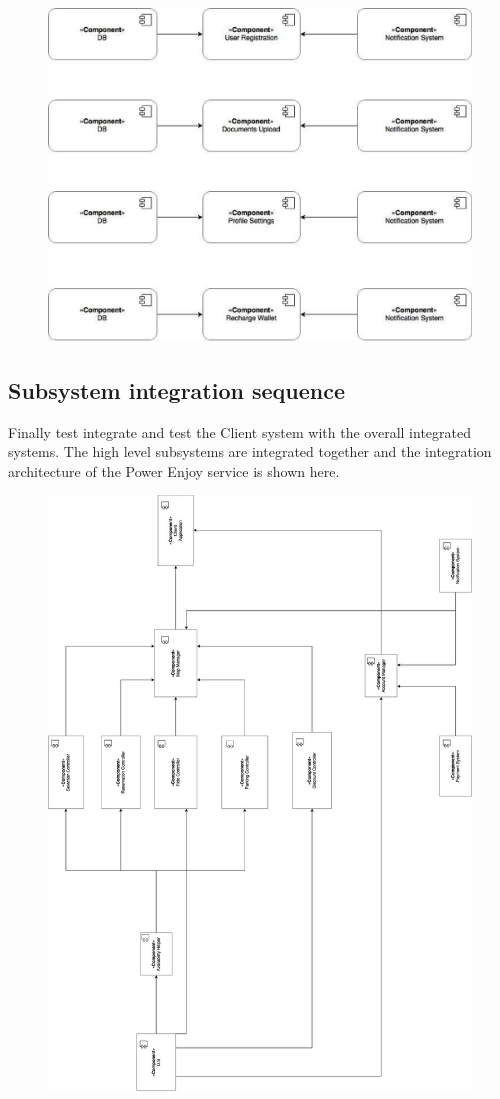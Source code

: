 \begin{figure}[h]
	\centering
	\includegraphics[height=8.86cm,keepaspectratio]{figures/itp9.eps}
	\label{fig:itp9}
\end{figure}

\subsection{Subsystem integration sequence}
Finally test integrate and test the Client system with the overall integrated systems. The high level subsystems are integrated together and the integration architecture of the Power Enjoy service is shown here.

\begin{figure}[h]
	\centering
	\includegraphics[width=\linewidth,keepaspectratio]{figures/components_controller.eps}
	\label{fig:components_controller}
\end{figure}
